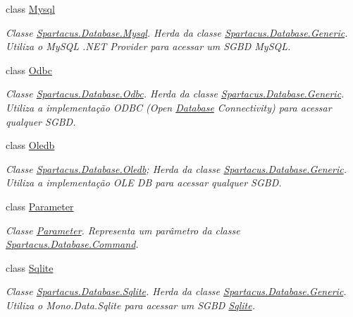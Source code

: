 \begin{DoxyCompactItemize}
class \hyperlink{classSpartacus_1_1Database_1_1Mysql}{Mysql}
\begin{DoxyCompactList}\small\item\em Classe \hyperlink{classSpartacus_1_1Database_1_1Mysql}{Spartacus.\+Database.\+Mysql}. Herda da classe \hyperlink{classSpartacus_1_1Database_1_1Generic}{Spartacus.\+Database.\+Generic}. Utiliza o My\+S\+Q\+L .N\+E\+T Provider para acessar um S\+G\+B\+D My\+S\+Q\+L. \end{DoxyCompactList}\item 
class \hyperlink{classSpartacus_1_1Database_1_1Odbc}{Odbc}
\begin{DoxyCompactList}\small\item\em Classe \hyperlink{classSpartacus_1_1Database_1_1Odbc}{Spartacus.\+Database.\+Odbc}. Herda da classe \hyperlink{classSpartacus_1_1Database_1_1Generic}{Spartacus.\+Database.\+Generic}. Utiliza a implementação O\+D\+B\+C (Open \hyperlink{namespaceSpartacus_1_1Database}{Database} Connectivity) para acessar qualquer S\+G\+B\+D. \end{DoxyCompactList}\item 
class \hyperlink{classSpartacus_1_1Database_1_1Oledb}{Oledb}
\begin{DoxyCompactList}\small\item\em Classe \hyperlink{classSpartacus_1_1Database_1_1Oledb}{Spartacus.\+Database.\+Oledb}; Herda da classe \hyperlink{classSpartacus_1_1Database_1_1Generic}{Spartacus.\+Database.\+Generic}. Utiliza a implementação O\+L\+E D\+B para acessar qualquer S\+G\+B\+D. \end{DoxyCompactList}\item 
class \hyperlink{classSpartacus_1_1Database_1_1Parameter}{Parameter}
\begin{DoxyCompactList}\small\item\em Classe \hyperlink{classSpartacus_1_1Database_1_1Parameter}{Parameter}. Representa um parâmetro da classe \hyperlink{classSpartacus_1_1Database_1_1Command}{Spartacus.\+Database.\+Command}. \end{DoxyCompactList}\item 
class \hyperlink{classSpartacus_1_1Database_1_1Sqlite}{Sqlite}
\begin{DoxyCompactList}\small\item\em Classe \hyperlink{classSpartacus_1_1Database_1_1Sqlite}{Spartacus.\+Database.\+Sqlite}. Herda da classe \hyperlink{classSpartacus_1_1Database_1_1Generic}{Spartacus.\+Database.\+Generic}. Utiliza o Mono.\+Data.\+Sqlite para acessar um S\+G\+B\+D \hyperlink{classSpartacus_1_1Database_1_1Sqlite}{Sqlite}. \end{DoxyCompactList}\end{DoxyCompactItemize}
